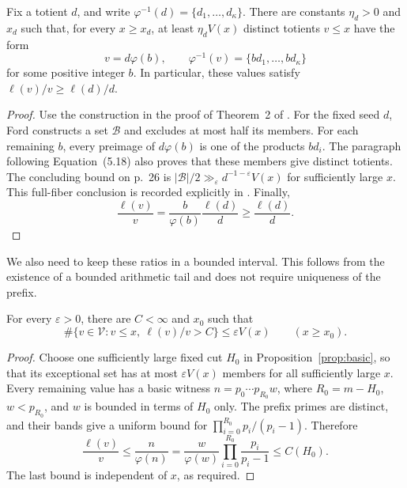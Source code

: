 \begin{lemma}\label{lem:fiber-propagation}
Fix a totient \(d\), and write
\(\varphi^{-1}(d)=\{d_1,\ldots,d_\kappa\}\).
There are constants \(\eta_d>0\) and \(x_d\) such that, for every
\(x\geq x_d\), at least \(\eta_dV(x)\) distinct totients \(v\leq x\)
have the form
\[
 v=d\varphi(b),\qquad
 \varphi^{-1}(v)=\{bd_1,\ldots,bd_\kappa\}
\]
for some positive integer \(b\).  In particular, these values satisfy
\(\ell(v)/v\geq\ell(d)/d\).
\end{lemma}

\begin{proof}
Use the construction in the proof of Theorem~2 of
\cite[Section~5, pp.~24--26, Equations~(5.10)--(5.19)]{FordTotients2013}.
For the fixed seed \(d\), Ford constructs a set \(\mathcal B\) and
excludes at most half its members.  For each remaining \(b\), every
preimage of \(d\varphi(b)\) is one of the products \(bd_i\).
The paragraph following Equation~(5.18) also proves that these members
give distinct totients.  The concluding bound on p.~26 is
\(\lvert\mathcal B\rvert/2\gg_\varepsilon d^{-1-\varepsilon}V(x)\)
for sufficiently large \(x\).  This full-fiber conclusion is recorded
explicitly in \cite[Section~7.3, p.~39]{FordTotients2013}.
Finally,
\[
 \frac{\ell(v)}v
    =\frac{b}{\varphi(b)}\frac{\ell(d)}d
    \geq\frac{\ell(d)}d.
\]
\end{proof}

We also need to keep these ratios in a bounded interval.  This follows
from the existence of a bounded arithmetic tail and does not require
uniqueness of the prefix.

\begin{lemma}\label{lem:ratio-tightness}
For every \(\varepsilon>0\), there are \(C<\infty\) and \(x_0\)
such that
\[
 \#\{v\in\mathcal V:v\leq x,\ \ell(v)/v>C\}
     \leq\varepsilon V(x)\qquad(x\geq x_0).
\]
\end{lemma}

\begin{proof}
Choose one sufficiently large fixed cut \(H_0\) in
Proposition~\ref{prop:basic}, so that its exceptional set has at most
\(\varepsilon V(x)\) members for all sufficiently large \(x\).
Every remaining value has a basic witness
\(n=p_0\cdots p_{R_0}w\), where \(R_0=m-H_0\),
\(w<p_{R_0}\), and \(w\) is bounded in terms of \(H_0\) only.
The prefix primes are distinct, and their bands give a uniform bound
for \(\prod_{i=0}^{R_0}p_i/(p_i-1)\).  Therefore
\[
 \frac{\ell(v)}v\leq\frac{n}{\varphi(n)}
   =\frac{w}{\varphi(w)}
      \prod_{i=0}^{R_0}\frac{p_i}{p_i-1}\leq C(H_0).
\]
The last bound is independent of \(x\), as required.
\end{proof}

